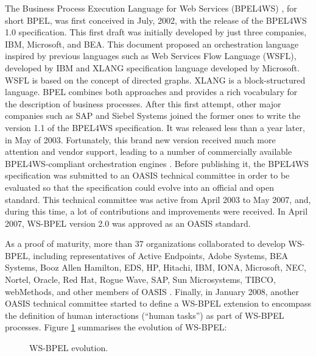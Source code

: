 The Business Process Execution Language for Web Services (BPEL4WS) \cite{wsbpelstandard}, for short BPEL, 
was first conceived in July, 2002, with the release of the BPEL4WS 
1.0 specification. This first draft was initially developed by just three companies, IBM, Microsoft, and BEA. 
This document proposed an orchestration language inspired 
by previous languages such as Web Services Flow Language (WSFL), developed by IBM and XLANG specification language developed
by Microsoft. WSFL is based on the concept of directed graphs.
XLANG is a block-structured language. BPEL combines
both approaches and provides a rich vocabulary for the description of business processes. 
After this first attempt, other major companies such as SAP and Siebel Systems joined the former ones to write
the version 1.1 of the BPEL4WS specification. It was released less than a year later, in May of 2003. 
Fortunately, this brand new version received much more attention and vendor support, 
leading to a number of commercially available BPEL4WS-compliant 
orchestration engines \cite{wsbpelstandard}. Before publishing it, 
the BPEL4WS specification was submitted to an OASIS 
technical committee in order to be evaluated so that the specification could evolve into an official and open standard.
This technical committee was active from April 2003 to May 2007, 
and, during this time, a lot of contributions and improvements were received. 
In April 2007, WS-BPEL version 2.0 was approved as an OASIS standard. 

As a proof of maturity, more than 37 organizations collaborated to develop WS-BPEL, including representatives of Active Endpoints, Adobe Systems, BEA Systems, Booz Allen Hamilton, EDS, HP, Hitachi, IBM, IONA, Microsoft, NEC, Nortel, Oracle, Red Hat, Rogue Wave, SAP, Sun Microsystems, TIBCO, webMethods, and other members of OASIS \cite{wsbpelstandard}.
Finally, in January 2008, another OASIS technical committee started 
to define a WS-BPEL extension to encompass the definition of 
human interactions (``human tasks'') as part of WS-BPEL processes. Figure \ref{bpelevolution} summarises the evolution of WS-BPEL:

\begin{figure}[h]
\begin{center}
\end{center}
\caption{WS-BPEL evolution.}
\label{bpelevolution}
\end{figure}

